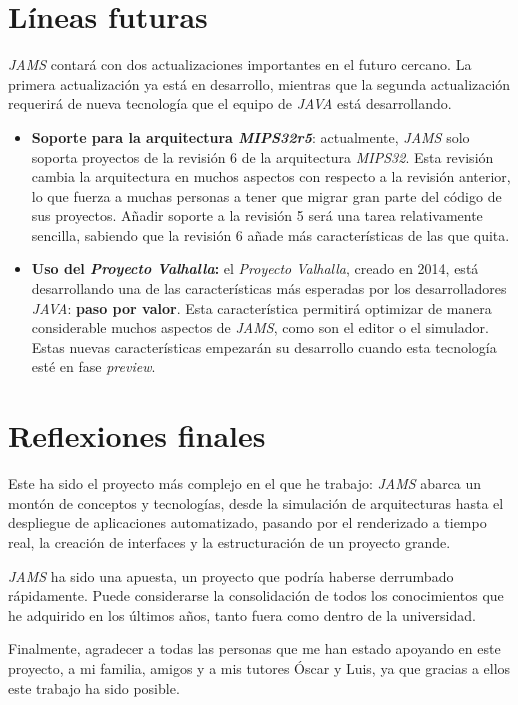 \section{Líneas futuras}\label{sec:líneas-futuras}

\textit{JAMS} contará con dos actualizaciones importantes en el
futuro cercano.
La primera actualización ya está en desarrollo, mientras que la
segunda actualización requerirá de nueva tecnología que
el equipo de \textit{JAVA} está desarrollando.
\begin{itemize}
    \item \textbf{Soporte para la arquitectura \textit{MIPS32r5}}:
    actualmente, \textit{JAMS} solo soporta proyectos de la revisión 6
    de la arquitectura \textit{MIPS32}.
    Esta revisión cambia la arquitectura en muchos aspectos con respecto
    a la revisión anterior, lo que fuerza a muchas personas a tener
    que migrar gran parte del código de sus proyectos.
    Añadir soporte a la revisión 5 será una tarea relativamente sencilla,
    sabiendo que la revisión 6 añade más características de las que quita.
    \item \textbf{Uso del \textit{Proyecto Valhalla}:} el
    \textit{Proyecto Valhalla}\cite{PROJECT_VALHALLA}, creado en 2014,
    está desarrollando una de las características más esperadas
    por los desarrolladores \textit{JAVA}: \textbf{paso por valor}.
    Esta característica permitirá optimizar de manera considerable
    muchos aspectos de \textit{JAMS}, como son el editor o el simulador.
    Estas nuevas características empezarán su desarrollo cuando esta
    tecnología esté en fase \textit{preview}.
\end{itemize}

\section{Reflexiones finales}\label{sec:reflexiones-finales}

Este ha sido el proyecto más complejo en el que he trabajo:
\textit{JAMS} abarca un montón de conceptos y tecnologías,
desde la simulación de arquitecturas hasta el despliegue de
aplicaciones automatizado, pasando por el renderizado a tiempo
real, la creación de interfaces y la estructuración de un
proyecto grande.

\textit{JAMS} ha sido una apuesta, un proyecto
que podría haberse derrumbado rápidamente.
Puede considerarse la consolidación de todos los conocimientos
que he adquirido en los últimos años, tanto fuera como dentro
de la universidad.

Finalmente, agradecer a todas las personas que me han
estado apoyando en este proyecto, a mi familia, amigos y a mis
tutores Óscar y Luis, ya que gracias a ellos este trabajo
ha sido posible.